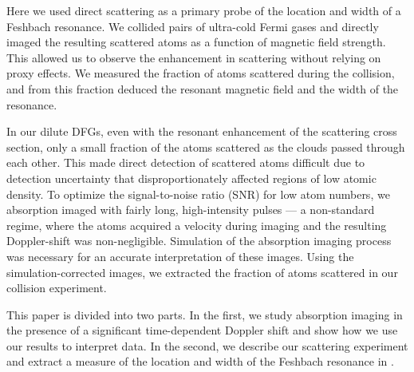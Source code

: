 \documentclass[12pt]{iopart}
\begin{document}
\par Here we used direct scattering as a primary probe of the location and width of a Feshbach resonance. We collided pairs of ultra-cold Fermi gases and directly imaged the resulting \swave{} scattered atoms as a function of magnetic field strength. This allowed us to observe the enhancement in scattering without relying on proxy effects. We measured the fraction of atoms scattered during the collision, and from this fraction deduced the resonant magnetic field  and the width of the resonance.

In our dilute DFGs, even with the resonant enhancement of the scattering cross section, only a small fraction of the atoms scattered as the clouds passed through each other. This made direct detection of scattered atoms difficult due to detection uncertainty that disproportionately affected regions of low atomic density. To optimize the signal-to-noise ratio (SNR) for low atom numbers, we absorption imaged with fairly long, high-intensity pulses --- a non-standard regime, where the atoms acquired a velocity during imaging and the resulting Doppler-shift was non-negligible.  Simulation of the absorption imaging process was necessary for an accurate interpretation of these images. Using the simulation-corrected images, we extracted the fraction of atoms scattered in our collision experiment.

This paper is divided into two parts. In the first, we study absorption imaging in the presence of a significant time-dependent Doppler shift and show how we use our results to interpret data. In the second, we describe our \swave{} scattering experiment and extract a measure of the location and width of the Feshbach resonance in \K{}.
\end{document}
